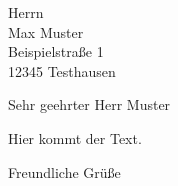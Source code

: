 \documentclass[
    pagenumber=botright,
    parskip=half,
    fontsize=12pt,
    fromalign=center,
    fromrule=true,
    foldmarks=true
    ]{scrlttr2}
\begin{document}
\begin{letter}{%
Herrn\\
Max Muster\\
Beispielstraße 1\\
12345 Testhausen}
\opening{Sehr geehrter Herr Muster}

Hier kommt der Text.

\closing{Freundliche Grüße}

\end{letter}
\end{document}
